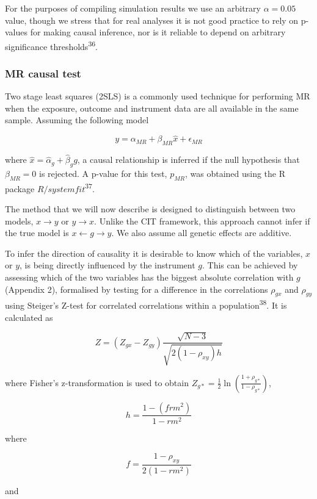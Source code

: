 \documentclass[]{article}
\begin{document}
For the purposes of compiling simulation results we use an arbitrary
\(\alpha = 0.05\) value, though we stress that for real analyses it is
not good practice to rely on p-values for making causal inference, nor
is it reliable to depend on arbitrary significance
thresholds\textsuperscript{36}.

\subsubsection{MR causal test}\label{mr-causal-test}

Two stage least squares (2SLS) is a commonly used technique for
performing MR when the exposure, outcome and instrument data are all
available in the same sample. Assuming the following model

\[
y = \alpha_{MR} + \beta_{MR} \hat{x} + \epsilon_{MR}
\]

where \(\hat{x} = \hat{\alpha}_g + \hat{\beta}_g g\), a causal
relationship is inferred if the null hypothesis that \(\beta_{MR} = 0\)
is rejected. A p-value for this test, \(p_{MR}\), was obtained using the
R package \(R/systemfit\)\textsuperscript{37}.

The method that we will now describe is designed to distinguish between
two models, \(x \rightarrow y\) or \(y \rightarrow x\). Unlike the CIT
framework, this approach cannot infer if the true model is
\(x \leftarrow g \rightarrow y\). We also assume all genetic effects are
additive.

To infer the direction of causality it is desirable to know which of the
variables, \(x\) or \(y\), is being directly influenced by the
instrument \(g\). This can be achieved by assessing which of the two
variables has the biggest absolute correlation with \(g\) (Appendix 2),
formalised by testing for a difference in the correlations \(\rho_{gx}\)
and \(\rho_{gy}\) using Steiger's Z-test for correlated correlations
within a population\textsuperscript{38}. It is calculated as

\[
Z = (Z_{gx} - Z_{gy}) \frac{\sqrt{N-3}}{\sqrt{2(1-\rho_{xy})h}}
\]

where Fisher's z-transformation is used to obtain
\(Z_{g*} = \frac{1}{2} \ln \left ( \frac{1+\rho_{g*}}{1-\rho_{g*}} \right )\),

\[
h = \frac{1 - (frm^2)} {1 - rm^2}
\]

where

\[
f = \frac{1 - \rho_{xy}}{2(1 - rm^2)}
\]

and
\end{document}
